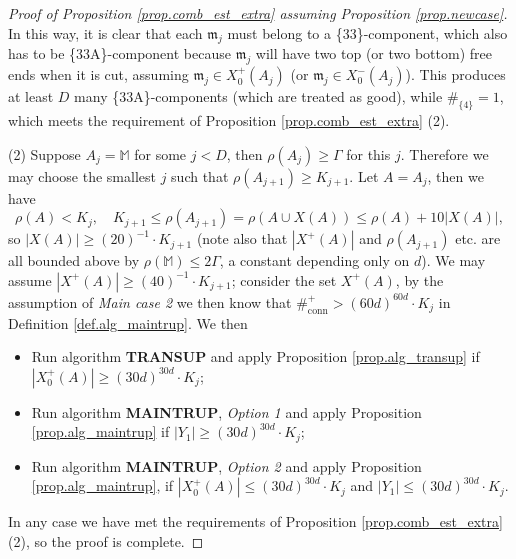\documentclass[10pt, reqno]{amsart}
\newcommand{\Mb}{\mathbb M}
\newcommand{\mf}{\mathfrak m}
\theoremstyle{definition}
\theoremstyle{remark}
\numberwithin{equation}{section}
\begin{document}
\begin{proof}[Proof of Proposition \ref{prop.comb_est_extra} assuming Proposition \ref{prop.newcase}]
In this way, it is clear that each $\mf_j$ must belong to a \{33\}-component, which also has to be \{33A\}-component because $\mf_j$ will have two top (or two bottom) free ends when it is cut, assuming $\mf_j\in X_0^+(A_j)$ (or $\mf_j\in X_0^-(A_j)$). This produces at least $D$ many \{33A\}-components (which are treated as good), while $\#_{\{4\}}=1$, which meets the requirement of Proposition \ref{prop.comb_est_extra} (2).

(2) Suppose $A_j=\Mb$ for some $j<D$, then $\rho(A_j)\geq\Gamma$ for this $j$. Therefore we may choose the smallest $j$ such that $\rho(A_{j+1})\geq K_{j+1}$. Let $A=A_j$, then we have
\[\rho(A)<K_j,\quad K_{j+1}\leq \rho(A_{j+1})=\rho(A\cup X(A))\leq \rho(A)+10|X(A)|,\] so $|X(A)|\geq (20)^{-1}\cdot K_{j+1}$ (note also that $|X^+(A)|$ and $\rho(A_{j+1})$ etc. are all bounded above by $\rho(\Mb)\leq 2\Gamma$, a constant depending only on $d$). We may assume $|X^+(A)|\geq (40)^{-1}\cdot K_{j+1}$; consider the set $X^+(A)$, by the assumption of \emph{Main case 2} we then know that $\#_{\mathrm{conn}}^+>(60d)^{60d}\cdot K_j$ in Definition \ref{def.alg_maintrup}. We then
\begin{itemize} 
\item Run algorithm \textbf{TRANSUP} and apply Proposition \ref{prop.alg_transup} if $|X_0^+(A)|\geq (30d)^{30d}\cdot K_j$;
\item Run algorithm \textbf{MAINTRUP}, \emph{Option 1} and apply Proposition \ref{prop.alg_maintrup} if $|Y_1|\geq (30d)^{30d}\cdot K_j$;
\item Run algorithm \textbf{MAINTRUP}, \emph{Option 2} and apply Proposition \ref{prop.alg_maintrup}, if $|X_0^+(A)|\leq (30d)^{30d}\cdot K_j$ and $|Y_1|\leq (30d)^{30d}\cdot K_j$.
\end{itemize} In any case we have met the requirements of Proposition \ref{prop.comb_est_extra} (2), so the proof is complete.
\end{proof}
\end{document}
